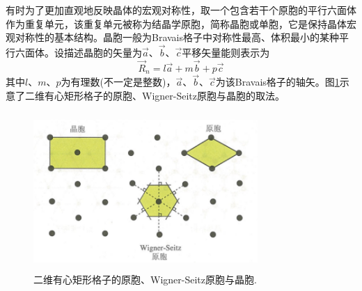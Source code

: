 有时为了更加直观地反映晶体的宏观对称性，取一个包含若干个原胞的平行六面体作为重复单元，该重复单元被称为结晶学原胞，简称晶胞或单胞，它是保持晶体宏观对称性的基本结构。晶胞一般为Bravais格子中对称性最高、体积最小的某种平行六面体。设描述晶胞的矢量为$\vec a$、$\vec b$、$\vec c$平移矢量能则表示为
\begin{equation}
	\vec R_n=l\vec a +m\vec b+p\vec c
	\label{eq:SSI-09}
\end{equation}
其中$l$、$m$、$p$为有理数(不一定是整数)，$\vec a$、$\vec b$、$\vec c$为该Bravais格子的轴矢。图\ref{Fig:Crystal-Primitive_Cell}示意了二维有心矩形格子的原胞、Wigner-Seitz原胞与晶胞的取法。
\begin{figure}[h!]
\centering
\vspace*{-0.05in}
\includegraphics[height=2.35in,width=3.35in,viewport=0 0 80 55,clip]{Figures/Crystal-Primitive_Cell.png}
\caption{\small \textrm{二维有心矩形格子的原胞、Wigner-Seitz原胞与晶胞.}}%
\label{Fig:Crystal-Primitive_Cell}
\end{figure}
 
